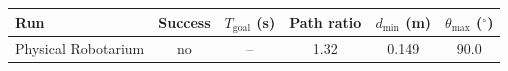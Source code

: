 \begin{tabular}{@{}lccccc@{}}
\toprule
\textbf{Run} & \textbf{Success} & $T_{\mathrm{goal}}$ (s) & \textbf{Path ratio} & $d_{\min}$ (m) & $\theta_{\max}$ ($^\circ$) \\
\midrule
Physical Robotarium & no & -- & 1.32 & 0.149 & 90.0 \\
\bottomrule
\end{tabular}
